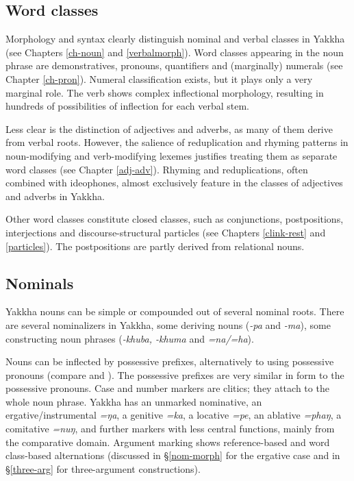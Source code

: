 \subsection{Word classes}

Morphology and syntax clearly distinguish nominal and verbal classes in Yakkha (see Chapters \ref{ch-noun} and \ref{verbalmorph}). Word classes appearing in the noun phrase are demonstratives, pronouns,  quantifiers and (marginally) numerals (see Chapter \ref{ch-pron}). Numeral classification exists, but it plays only a very marginal role. The verb shows complex inflectional morphology, resulting in hundreds of possibilities of inflection for each verbal stem. 


Less clear is the distinction of adjectives and adverbs, as many of them derive from verbal roots. However, the salience of reduplication and rhyming patterns in noun-modifying and verb-modifying lexemes justifies treating them as separate word classes (see Chapter \ref{adj-adv}). Rhyming and reduplications, often combined with ideophones, almost exclusively feature in the classes of adjectives and adverbs in Yakkha.


Other word classes constitute closed classes, such as conjunctions, postpositions, interjections and discourse-structural particles (see Chapters  \ref{clink-rest} and \ref{particles}). The postpositions are partly derived from relational nouns. 


\subsection{Nominals}

Yakkha nouns can be simple or compounded out of several nominal roots. There are several nominalizers in Yakkha, some deriving nouns (\emph{-pa} and \emph{-ma}), some constructing noun phrases (\emph{-khuba, -khuma} and \emph{=na/=ha}).

 Nouns can be inflected by possessive prefixes, alternatively to using possessive pronouns (compare \Next[a] and \Next[b]). The possessive prefixes are very similar in form to the possessive pronouns. Case and number markers are clitics; they attach to the whole noun phrase. Yakkha has an unmarked nominative, an ergative/instrumental \emph{=ŋa}, a genitive \emph{=ka}, a locative \emph{=pe}, an ablative \emph{=phaŋ}, a comitative \emph{=nuŋ}, and further markers with less central functions, mainly from the comparative domain. Argument marking shows reference-based and word class-based alternations (discussed in §\ref{nom-morph} for the ergative case and in §\ref{three-arg} for three-argument constructions).

